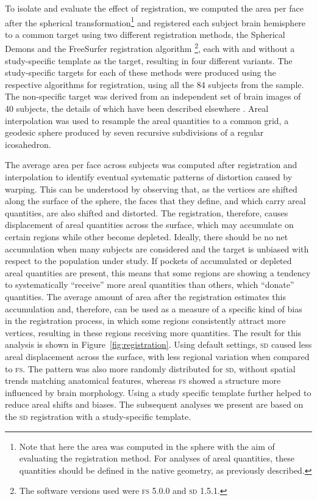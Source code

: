 To isolate and evaluate the effect of registration, we computed the area per face after the spherical transformation\footnote{Note that here the area was computed in the sphere with the aim of evaluating the registration method. For analyses of areal quantities, these quantities should be defined in the native geometry, as previously described.} and registered each subject brain hemisphere to a common target using two different registration methods, the Spherical Demons \citep{Yeo2010} and the FreeSurfer registration algorithm \citep{Fischl1999_intersubject}\footnote{The software versions used were \textsc{fs} 5.0.0 and \textsc{sd} 1.5.1.}, each with and without a study-specific template as the target, resulting in four different variants. The study-specific targets for each of these methods were produced using the respective algorithms for registration, using all the 84 subjects from the sample. The non-specific target was derived from an independent set of brain images of 40 subjects, the details of which have been described elsewhere \citep{Desikan2006}. Areal interpolation was used to resample the areal quantities to a common grid, a geodesic sphere produced by seven recursive subdivisions of a regular icosahedron.

The average area per face across subjects was computed after registration and interpolation to identify eventual systematic patterns of distortion caused by warping. This can be understood by observing that, as the vertices are shifted along the surface of the sphere, the faces that they define, and which carry areal quantities, are also shifted and distorted. The registration, therefore, causes displacement of areal quantities across the surface, which may accumulate on certain regions while other become depleted. Ideally, there should be no net accumulation when many subjects are considered and the target is unbiased with respect to the population under study. If pockets of accumulated or depleted areal quantities are present, this means that some regions are showing a tendency to systematically ``receive'' more areal quantities than others, which ``donate'' quantities. The average amount of area after the registration estimates this accumulation and, therefore, can be used as a measure of a specific kind of bias in the registration process, in which some regions consistently attract more vertices, resulting in these regions receiving more quantities. The result for this analysis is shown in Figure~\ref{fig:registration}. Using default settings, \textsc{sd} caused less areal displacement across the surface, with less regional variation when compared to \textsc{fs}. The pattern was also more randomly distributed for \textsc{sd}, without spatial trends matching anatomical features, whereas \textsc{fs} showed a structure more influenced by brain morphology. Using a study specific template further helped to reduce areal shifts and biases. The subsequent analyses we present are based on the \textsc{sd} registration with a study-specific template.

